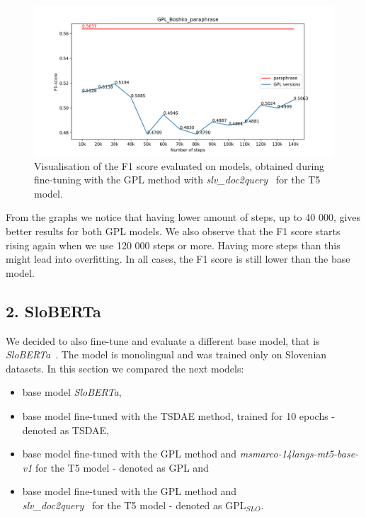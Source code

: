 \documentclass[fleqn,moreauthors,10pt]{ds_report}
\begin{document}
\begin{figure}[ht]\centering
	\vspace{12 pt}
	\includegraphics[width=\linewidth]{GPL_Boshko_paraphrase.png}
	\vspace{5 pt}
	\caption{Visualisation of the F1 score evaluated on models, obtained during fine-tuning with the GPL method with {\it slv\_doc2query}~\cite{boshko} for the T5 model.}
	\label{fig:gpl-slo-versions}
\end{figure}


From the graphs we notice that having lower amount of steps, up to 40 000, gives better results for both GPL models.
We also observe that the F1 score starts rising again when we use 120 000 steps or more. Having more steps than this
might lead into overfitting. In all cases, the F1 score is still lower than the base model.



\subsection*{\large{2. SloBERTa}}
We decided to also fine-tune and evaluate a different base model, that is {\it SloBERTa}~\cite{sloberta}. The model is monolingual and was trained only on Slovenian datasets. In this section we compared the next models:
\begin{itemize}
	\item base model {\it SloBERTa},
	\item base model fine-tuned with the TSDAE method, trained for 10 epochs - denoted as TSDAE,
	\item base model fine-tuned with the GPL method and {\it msmarco-14langs-mt5-base-v1} \cite{msmarco14langs} for the T5 model - denoted as GPL and
	\item base model fine-tuned with the GPL method and \\{\it slv\_doc2query}~\cite{boshko} for the T5 model - denoted as $\text{GPL}_{SLO}$.
\end{itemize}
\end{document}
